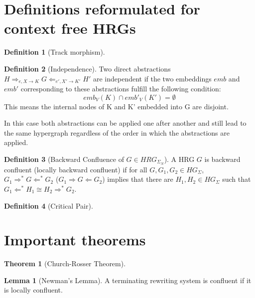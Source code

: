 \documentclass[12pt]{article}
\newtheorem{theorem}{Theorem}
\theoremstyle{definition}
\newtheorem{lemma}{Lemma}
\newtheorem{definition}{Definition}
\begin{document}
\maketitle

\begin{abstract}
In general hypergraph transformation systems confluence and backwards confluence is not decidable. This thesis explores if it is possible to decide backwards confluence for context free hyperedge replacement grammars (HRG).
Additionally it shows heuristics to complete HRGs by adding additional rules that lead to a backwards confluent HRG.
\end{abstract}

\section{Definitions reformulated for context free HRGs}
\begin{definition}[Track morphism]
\end{definition}

\begin{definition}[Independence]
Two direct abstractions $H \Rightarrow_{e, X \rightarrow K} G \Leftarrow_{e', X' \rightarrow K'} H' $ are independent if the two embeddings $emb$ and $emb'$ corresponding to these abstractions fulfill the following condition:
$$emb_V(K) \cap emb'_V(K') = \emptyset$$
This means the internal nodes of K and K' embedded into G are disjoint.

In this case both abstractions can be applied one after another and still lead to the same hypergraph regardless of the order in which the abstractions are applied.
\end{definition}

\begin{definition}[Backward Confluence of $G \in HRG_{\Sigma_N}$]
A HRG $G$ is backward confluent (locally backward confluent) if for all $G, G_1, G_2 \in HG_\Sigma$, $G_1 \Rightarrow^* G \Leftarrow^* G_2$ ($G_1 \Rightarrow G \Leftarrow G_2$) implies that there are $H_1, H_2 \in HG_\Sigma$ such that $G_1 \Leftarrow^*H_1 \cong H_2 \Rightarrow^* G_2$.
\end{definition}

\begin{definition}[Critical Pair]

\end{definition}

\section{Important theorems}

\begin{theorem}[Church-Rosser Theorem]
\end{theorem}

\begin{lemma}[Newman's Lemma]
A terminating rewriting system is confluent if it is locally confluent.
\end{lemma}
\end{document}
